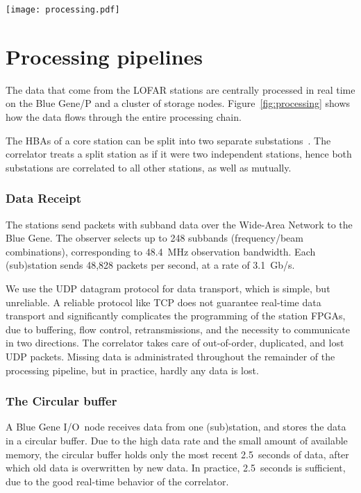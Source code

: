 \begin{figure*}
\begin{center}
\texttt{[image: processing.pdf]}
\end{center}
\caption{Bla bla}
\label{fig:processing}
\end{figure*}


\section{Processing pipelines}

The data that come from the LOFAR stations are centrally processed in real
time on the Blue Gene/P and a cluster of storage nodes.
Figure~\ref{fig:processing} shows how the data flows through the entire
processing chain.

The HBAs of a core station can be split into two separate substations~\cite{?}.
The correlator treats a split station as if it were two independent stations,
hence both substations are correlated to all other stations, as well as
mutually.



\subsubsection{Data Receipt}

The stations send packets with subband data over the Wide-Area Network to the
Blue Gene.
The observer selects up to 248 subbands (frequency/beam combinations),
corresponding to 48.4~MHz observation bandwidth.
Each (sub)station sends 48,828 packets per second, at a rate of 3.1~Gb/s.

We use the UDP datagram protocol for data transport, which is simple, but
unreliable.
A reliable protocol like TCP does not guarantee real-time data transport
and significantly complicates the programming of the station FPGAs, due to
buffering, flow control, retransmissions, and the necessity to communicate
in two directions.
The correlator takes care of out-of-order, duplicated, and lost UDP packets.
Missing data is administrated throughout the remainder of the processing
pipeline, but in practice, hardly any data is lost.


\subsubsection{The Circular buffer}
\label{sec:circular-buffer}

A Blue Gene I/O~node receives data from one (sub)station, and stores the
data in a circular buffer.
Due to the high data rate and the small amount of available memory,
the circular buffer holds only the most recent 2.5~seconds of data, after
which old data is overwritten by new data.
In practice, 2.5~seconds is sufficient, due to the good real-time behavior of
the correlator.



